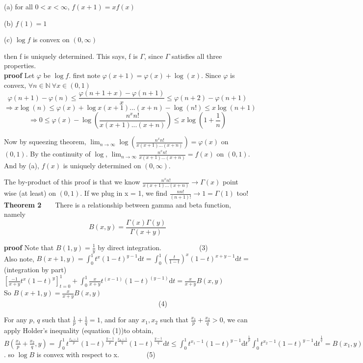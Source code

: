 \documentclass[a4paper,12pt]{article}
\begin{document}
(a) for all $0<x<\infty$, $f(x+1) = xf(x)$ 

(b) $f(1) = 1$

(c) $\log f$ is convex on $(0, \infty)$

then f is uniquely determined. This says, f is $\Gamma$, since $\Gamma$ satisfies all three properties.\\

\textbf{proof} Let $\varphi$ be $\log f$. first note $\varphi(x+1) = \varphi(x) + \log(x)$. Since $\varphi$ is convex, 
$\forall n \in \mathbb{N}\ \forall x \in (0, 1)$ $$ \varphi(n+1)-\varphi(n) \leq\frac{\varphi(n+1+x)-\varphi(n+1)}{x} \leq\varphi(n+2) - \varphi(n+1) $$
$$\Rightarrow x \log(n) \leq \varphi(x) + \log x(x+1)...(x+n)-\log(n!) \leq x \log(n+1)$$
$$\Rightarrow 0 \leq \varphi(x) - \log( \frac{n^xn!}{x(x+1)...(x+n)}) \leq x \log( 1+\frac{1}{n} )$$

Now by squeezing theorem, $\lim_{n \to \infty}\log( \frac{n^xn!}{x(x+1)...(x+n)}) = \varphi(x)$ on $(0, 1)$.
By the continuity of $\log$,  $\lim_{n \to \infty}\frac{n^xn!}{x(x+1)...(x+n)} = f(x)$ on $(0, 1)$. And by (a), $f(x)$ is uniquely determined on $(0, \infty)$.

The by-product of this proof is that we know $\frac{n^xn!}{x(x+1)...(x+n)} \to \Gamma(x)$ point wise (at least) on $(0, 1)$. If we plug in x = 1, we find $\frac{n n!}{(n+1)!} \to 1 = \Gamma(1)$ too!\\

\textbf{Theorem 2}\ \ \ \ There is a relationship between gamma and beta function, namely
$$B(x, y) = \frac{\Gamma(x)\Gamma(y)}{\Gamma(x+y)}$$

\textbf{proof} Note that $B(1, y) = \frac{1}{y}$ by direct integration.\ \ \ \ \ \ \ \ \ \ \ (3)\\
Also note,  $B(x+1, y) = \int_0^1 t^{x}(1-t)^{y-1}\mathrm{d}t = \int_0^1 (\frac{t}{1-t})^{x}(1-t)^{x+y-1}\mathrm{d}t =$
 (integration by part)
$[\frac{-1}{x+y}t^x(1-t)^y]_{t=0}^1 + \int_0^1 \frac{x}{x+y}t^(x-1)(1-t)^(y-1) \mathrm{d}t = \frac{x}{x+y}B(x, y)$\\
So $B(x+1, y) = \frac{x}{x+y}B(x, y)$\ \ \ \ \ \ \ \ \ \ \ \ \ \ \ \ \ \ \ \ \ \ \ \ \ \ \ \ \ \ \ \ \ \ \ \ \ \ \ \ \ \ \ \ \ (4)

For any $p$, $q$ such that $\frac{1}{p} + \frac{1}{q} = 1$, and for any $x_1, x_2$ such that $\frac{x_1}{p} + \frac{x_2}{q}>0$, we can apply Holder's inequality (equation (1))to obtain, 
$B( \frac{x_1}{p} + \frac{x_2}{q}, y ) = \int_0^1 t^{\frac{x_1-1}{p}} (1-t)^{\frac{y-1}{p}} t^{\frac{x_2-1}{q}} (1-t)^{\frac{y-1}{q}}\mathrm{d}t
\leq {\int_0^1 t^{x_1-1} (1-t)^{y-1} \mathrm{d}t} ^ {\frac{1}{p}} {\int_0^1 t^{x_2-1} (1-t)^{y-1}\mathrm{d}t}^{\frac{1}{q}} = B(x_1, y)^{\frac{1}{p}}B(x_2, y)^{\frac{1}{q}}$. so $\log B$ is convex with respect to x.\ \ \ \ \ \ \ \ (5)\\
\end{document}
